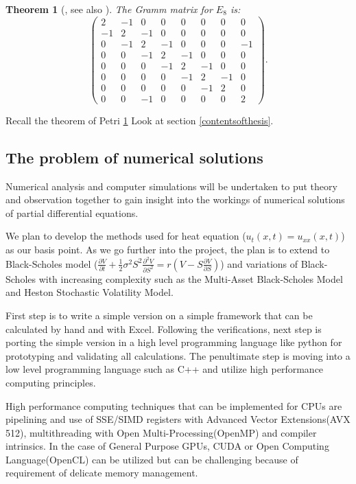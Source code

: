 \documentclass[12pt, oneside]{book}
\theoremstyle{plain}
\newtheorem{theorem}{Theorem}[section]
\theoremstyle{definition}
\begin{document}
\begin{theorem}[{\cite[Theorem 2.3]{Petri}, see also \cite[pg. 45]{BlackScholes}}]\label{PetriTheorem}
The Gramm matrix for $E_8$ is:
$$
\begin{pmatrix}
2	&-1&0	&0	&0	&0	&0	&0\\
-1	&2	&-1	&0	&0	&0	&0	&0\\
0	&-1	&2	&-1	&0	&0	&0	&-1\\
0	&0	&-1	&2	&-1	&0	&0	&0\\
0	&0	&0	&-1	&2	&-1	&0	&0\\
0	&0	&0	&0	&-1	&2	&-1	&0\\
0	&0	&0	&0	&0	&-1	&2	&0\\
0	&0	&-1	&0	&0	&0	&0	&2
\end{pmatrix}.
$$
\end{theorem}


Recall the theorem of Petri \ref{PetriTheorem}
Look at section \ref{contentsofthesis}.

\subsection{The problem of numerical solutions}
Numerical analysis and computer simulations will be undertaken to put theory and observation together to gain insight into the workings of numerical solutions of partial differential equations.

We plan to develop the methods used for heat equation (${u_t(x,t)=u_{xx}(x,t)}$) as our basis point. As we go further into the project, the plan is to extend to Black-Scholes model ($\frac{\partial V}{\partial t} + \frac{1}{2}\sigma^2 S^2 \frac{\partial^2 V}{\partial S^2} = r(V - S \frac{\partial V}{\partial S})$)  and variations of Black-Scholes with increasing complexity such as the Multi-Asset Black-Scholes Model and Heston Stochastic Volatility Model.

First step is to write a simple version on a simple framework that can be calculated by hand and with Excel. Following the verifications, next step is porting the simple version in a high level programming language like python for prototyping and validating all calculations. The penultimate step is moving into a low level programming language such as C++ and utilize high performance computing principles.

High performance computing techniques that can be implemented for CPUs are pipelining and use of SSE/SIMD\cite{kusswurm} registers with Advanced Vector Extensions(AVX 512), multithreading with Open Multi-Processing(OpenMP) and compiler intrinsics. In the case of General Purpose GPUs, CUDA or Open Computing Language(OpenCL) can be utilized but can be challenging because of requirement of delicate memory management.
\end{document}

